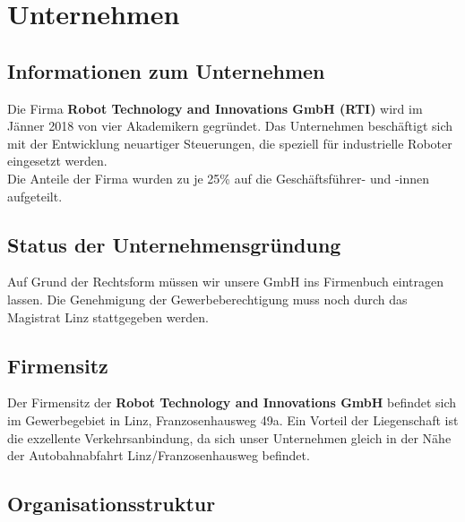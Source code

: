 \chapter{Unternehmen}
\section{Informationen zum Unternehmen}
Die Firma \textbf{Robot Technology and Innovations GmbH (RTI)} wird im Jänner 2018 von vier Akademikern gegründet. Das Unternehmen beschäftigt sich mit der Entwicklung neuartiger Steuerungen, die speziell für industrielle Roboter eingesetzt werden. \\
Die Anteile der Firma wurden zu je 25\% auf die Geschäftsführer- und -innen aufgeteilt. 




\section{Status der Unternehmensgründung}
Auf Grund der Rechtsform müssen wir unsere GmbH ins Firmenbuch eintragen lassen. Die Genehmigung der Gewerbeberechtigung muss noch durch das Magistrat Linz stattgegeben werden. 


\section{Firmensitz}
Der Firmensitz der \textbf{Robot Technology and Innovations GmbH}  befindet sich im Gewerbegebiet in Linz, Franzosenhausweg 49a. Ein Vorteil der Liegenschaft ist die exzellente Verkehrsanbindung, da sich unser Unternehmen gleich in der Nähe der Autobahnabfahrt Linz/Franzosenhausweg befindet. 



\section{Organisationsstruktur}

